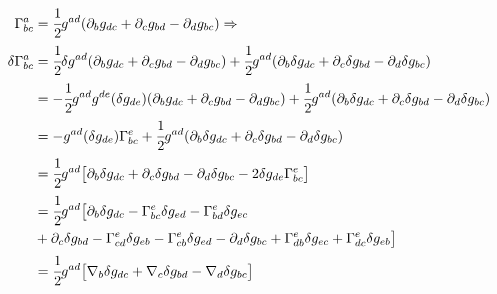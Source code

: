 \documentclass[UTF8]{article}
\begin{document}
\begin{align}
\Gamma^{a}_{bc} &= \cfrac{1}{2}g^{ad}(\partial_{b}g_{dc} + \partial_{c}g_{bd} - \partial_{d}g_{bc})  \Rightarrow\\
\delta\Gamma^{a}_{bc} &= \cfrac{1}{2}\delta g^{ad}(\partial_{b}g_{dc} + \partial_{c}g_{bd} - \partial_{d}g_{bc})  + \cfrac{1}{2}g^{ad}(\partial_{b}\delta g_{dc} + \partial_{c}\delta g_{bd} - \partial_{d}\delta g_{bc}) \\
& = -\cfrac{1}{2}g^{ad}g^{de}(\delta g_{de})(\partial_{b}g_{dc} + \partial_{c}g_{bd} - \partial_{d}g_{bc})
+ \cfrac{1}{2}g^{ad}(\partial_{b}\delta g_{dc} + \partial_{c}\delta g_{bd} - \partial_{d}\delta g_{bc})\\
& = -g^{ad}(\delta g_{de})\Gamma^{e}_{bc}+ \cfrac{1}{2}g^{ad}(\partial_{b}\delta g_{dc} + \partial_{c}\delta g_{bd} - \partial_{d}\delta g_{bc})\\
&= \cfrac{1}{2}g^{ad}\big[\partial_{b}\delta g_{dc} + \partial_{c}\delta g_{bd} - \partial_{d}\delta g_{bc} - 2\delta g_{de}\Gamma^{e}_{bc}\big] \\
&=\cfrac{1}{2} g^{ad}\big[ \partial_{b}\delta g_{dc} -\Gamma^{e}_{bc}\delta g_{ed} -\Gamma^{e}_{bd}\delta g_{ec}\\
&+\partial_{c}\delta g_{bd} -\Gamma^{e}_{cd}\delta g_{eb} - \Gamma^{e}_{cb}\delta g_{ed} - \partial_{d}\delta g_{bc} + \Gamma^{e}_{db}\delta g_{ec} + \Gamma^{e}_{dc}\delta g_{eb} \big]\\
&= \cfrac{1}{2}g^{ad}\big[\nabla_{b}\delta g_{dc}+\nabla_{c}\delta g_{bd}- \nabla_{d}\delta g_{bc}\big]
\end{align}
\end{document}
